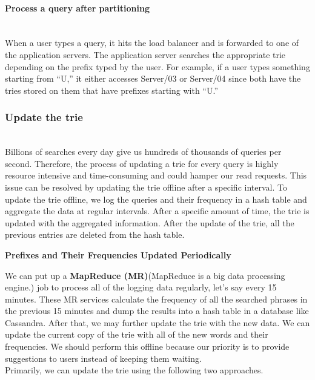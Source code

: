 \paragraph{Process a query after partitioning}\label{TlksXchO0xwDycRSgxep3}
\\
When a user types a query, it hits the load balancer and is forwarded to one of the application servers. The application server searches the appropriate trie depending on the prefix typed by the user. For example, if a user types something starting from ``U,'' it either accesses Server/03 or Server/04 since both have the tries stored on them that have prefixes starting with ``U.''

\subsubsection{Update the trie}\label{5rHYEe723dE4Gwr0g48Hp}
\\
Billions of searches every day give us hundreds of thousands of queries per second. Therefore, the process of updating a trie for every query is highly resource intensive and time-consuming and could hamper our read requests. This issue can be resolved by updating the trie offline after a specific interval. To update the trie offline, we log the queries and their frequency in a hash table and aggregate the data at regular intervals. After a specific amount of time, the trie is updated with the aggregated information. After the update of the trie, all the previous entries are deleted from the hash table.

\textbf{Prefixes and Their Frequencies Updated Periodically}

\begin{table}[htbp]
\centering
\small
{}
\caption{Prefixes and Their Frequencies Updated Periodically}
\end{table}

We can put up a \textbf{MapReduce (MR)}(MapReduce is a big data processing engine.) job to process all of the logging data regularly, let's say every 15 minutes. These MR services calculate the frequency of all the searched phrases in the previous 15 minutes and dump the results into a hash table in a database like Cassandra. After that, we may further update the trie with the new data. We can update the current copy of the trie with all of the new words and their frequencies. We should perform this offline because our priority is to provide suggestions to users instead of keeping them waiting.
\\
Primarily, we can update the trie using the following two approaches.

